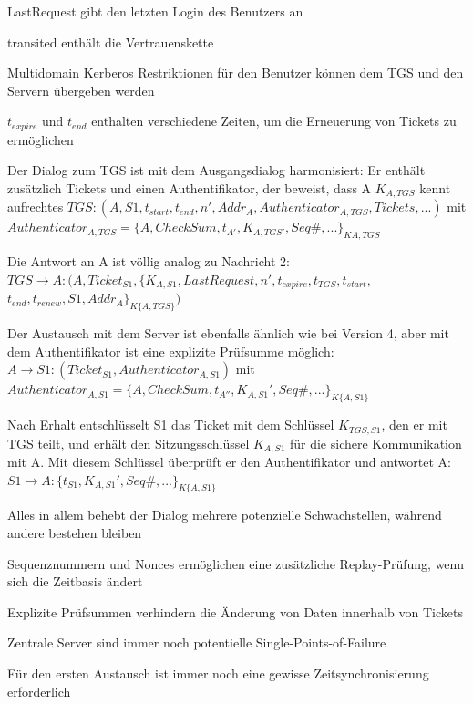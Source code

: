 \documentclass[a4paper]{article}
\begin{document}
\begin{multicols}{3}
\begin{itemize*}
            \begin{itemize*}
                  \item LastRequest gibt den letzten Login des Benutzers an
                  \item transited enthält die Vertrauenskette
                  \item Multidomain Kerberos Restriktionen für den Benutzer können dem TGS und den Servern übergeben werden
                  \item $t_{expire}$ und $t_{end}$ enthalten verschiedene Zeiten, um die Erneuerung von Tickets zu ermöglichen %
            \end{itemize*}
            \item Der Dialog zum TGS ist mit dem Ausgangsdialog harmonisiert: Er enthält zusätzlich Tickets und einen Authentifikator, der beweist, dass A $K_{A,TGS}$ kennt aufrechtes $TGS:(A,S1,t_{start},t_{end},n',Addr_A,Authenticator_{A,TGS}, Tickets,...)$ mit $Authenticator_{A,TGS}=\{A, CheckSum, t_{A'}, K_{A,TGS'}, Seq\#,...\}_{{K}{A,TGS}}$ %
            \item Die Antwort an A ist völlig analog zu Nachricht 2: $TGS\rightarrow A:(A,Ticket_{S1},\{K_{A,S1},LastRequest, n',t_{expire},t_{TGS},t_{start},$ $t_{end},t_{renew},S1,Addr_A\}_{K\{A,TGS\}})$
            \item Der Austausch mit dem Server ist ebenfalls ähnlich wie bei Version 4, aber mit dem Authentifikator ist eine explizite Prüfsumme möglich: $A\rightarrow S1:(Ticket_{S1}, Authenticator_{A,S1})$ mit $Authenticator_{A,S1}=\{A,CheckSum,t_{A''},K_{A,S1}', Seq\#, ...\}_{K\{A,S1\}}$
            \item Nach Erhalt entschlüsselt S1 das Ticket mit dem Schlüssel $K_{TGS,S1}$, den er mit TGS teilt, und erhält den Sitzungsschlüssel $K_{A,S1}$ für die sichere Kommunikation mit A. Mit diesem Schlüssel überprüft er den Authentifikator und antwortet A: $S1\rightarrow A:\{t_{S1},K_{A,S1}',Seq\#,...\}_{K\{A,S1\}}$
            \item Alles in allem behebt der Dialog mehrere potenzielle Schwachstellen, während andere bestehen bleiben
            \begin{itemize*}
                  \item Sequenznummern und Nonces ermöglichen eine zusätzliche Replay-Prüfung, wenn sich die Zeitbasis ändert
                  \item Explizite Prüfsummen verhindern die Änderung von Daten innerhalb von Tickets
                  \item Zentrale Server sind immer noch potentielle Single-Points-of-Failure
                  \item Für den ersten Austausch ist immer noch eine gewisse Zeitsynchronisierung erforderlich
            \end{itemize*}
      \end{itemize*}


\end{multicols}
\end{document}
